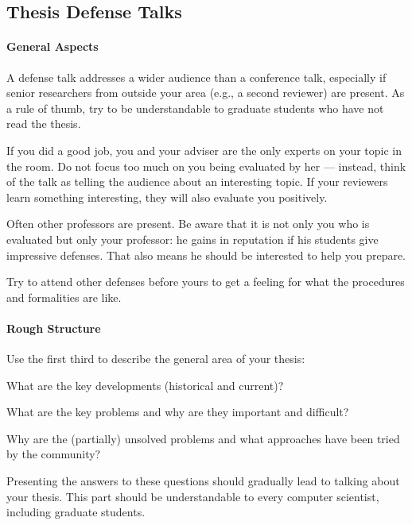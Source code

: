 \documentclass[12pt]{article}
\begin{document}
\subsection{Thesis Defense Talks}

\paragraph{General Aspects}
A defense talk addresses a wider audience than a conference talk, especially if senior researchers from outside your area (e.g., a second reviewer) are present.
As a rule of thumb, try to be understandable to graduate students who have not read the thesis.
\medskip

If you did a good job, you and your adviser are the only experts on your topic in the room.
Do not focus too much on you being evaluated by her --- instead, think of the talk as telling the audience about an interesting topic.
If your reviewers learn something interesting, they will also evaluate you positively. 
\medskip

Often other professors are present.
Be aware that it is not only you who is evaluated but only your professor: he gains in reputation if his students give impressive defenses.
That also means he should be interested to help you prepare. 
\medskip

Try to attend other defenses before yours to get a feeling for what the procedures and formalities are like.

\paragraph{Rough Structure}
Use the first third to describe the general area of your thesis:
\begin{compactitem}
 \item What are the key developments (historical and current)?
 \item What are the key problems and why are they important and difficult?
 \item Why are the (partially) unsolved problems and what approaches have been tried by the community?
\end{compactitem}
Presenting the answers to these questions should gradually lead to talking about your thesis.
This part should be understandable to every computer scientist, including graduate students.
\medskip
\end{document}
